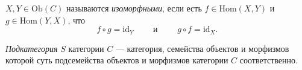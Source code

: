 \documentclass[12pt,a4paper]{article}
\newcommand{\Hom}{\mathrm{Hom}}
\newcommand{\Ob}{\mathrm{Ob}}
\newcommand{\id}{\mathrm{id}}
\begin{document}
    \begin{definition}
        $X, Y \in \Ob(C)$ называются \emph{изоморфными}, если есть $f \in \Hom(X, Y)$ и $g \in \Hom(Y, X)$, что
        \[f \circ g = \id_Y \qquad \text{ и } \qquad g \circ f = \id_X.\]
    \end{definition}

    \begin{definition}
        \emph{Подкатегория} $S$ категории $C$ --- категория, семейства объектов и морфизмов которой суть подсемейства объектов и морфизмов категории $C$ соответственно.
    \end{definition}
\end{document}

